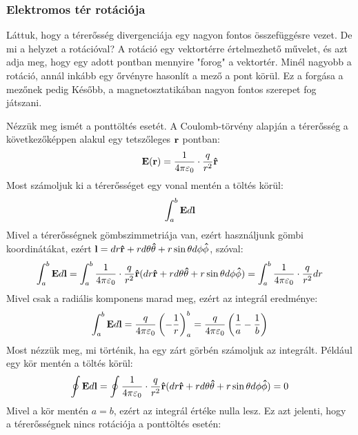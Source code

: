 \documentclass[a4paper,12pt]{article}
\begin{document}
\subsubsection{Elektromos tér rotációja}
Láttuk, hogy a térerősség divergenciája egy nagyon fontos összefüggésre vezet. De mi a helyzet a rotációval? A rotáció egy vektortérre értelmezhető művelet, és azt adja meg, hogy egy adott pontban
mennyire "forog" a vektortér. Minél nagyobb a rotáció, annál inkább egy őrvényre hasonlít a mező a pont körül. Ez a forgása a mezőnek pedig Később, a magnetosztatikában nagyon fontos szerepet fog játszani.

Nézzük meg ismét a ponttöltés esetét. A Coulomb-törvény alapján a térerősség a következőképpen alakul egy tetszőleges $\bold{r}$ pontban:
\begin{equation}
    \bold{E}(\bold{r}) = \frac{1}{4 \pi \varepsilon_0} \cdot \frac{q}{r^2} \bold{\hat{r}}
\end{equation}
Most számoljuk ki a térerősséget egy vonal mentén a töltés körül:
\begin{equation}
    \int_{a}^{b} \bold{E} d\bold{l}
\end{equation}
Mivel a térerősségnek gömbszimmetriája van, ezért használjunk gömbi koordinátákat, ezért $\bold{l} = dr \bold{\hat{r}} + r d\theta \bold{\hat{\theta}} + r \sin\theta d\phi \bold{\hat{\phi}}$, szóval:
\begin{equation}
    \int_{a}^{b} \bold{E} d\bold{l} = \int_{a}^{b} \frac{1}{4 \pi \varepsilon_0} \cdot \frac{q}{r^2} \bold{\hat{r}} (dr \bold{\hat{r}} + r d\theta \bold{\hat{\theta}} + r \sin\theta d\phi \bold{\hat{\phi}}) = \int_{a}^{b} \frac{1}{4 \pi \varepsilon_0} \cdot \frac{q}{r^2} dr
\end{equation}
Mivel csak a radiális komponens marad meg, ezért az integrál eredménye:
\begin{equation}
    \int_{a}^{b} \bold{E} d\bold{l} = \frac{q}{4 \pi \varepsilon_0} \left( -\frac{{1}}{r} \right)_{a}^{b} = \frac{q}{4 \pi \varepsilon_0} \left( \frac{1}{a} - \frac{1}{b} \right)
\end{equation}
Most nézzük meg, mi történik, ha egy zárt görbén számoljuk az integrált. Például egy kör mentén a töltés körül:
\begin{equation}
    \oint \bold{E} d\bold{l} = \oint \frac{1}{4 \pi \varepsilon_0} \cdot \frac{q}{r^2} \bold{\hat{r}} (dr \bold{\hat{r}} + r d\theta \bold{\hat{\theta}} + r \sin\theta d\phi \bold{\hat{\phi}}) = 0
\end{equation}
Mivel a kör mentén $a = b$, ezért az integrál értéke nulla lesz. Ez azt jelenti, hogy a térerősségnek nincs rotációja a ponttöltés esetén:
\end{document}

